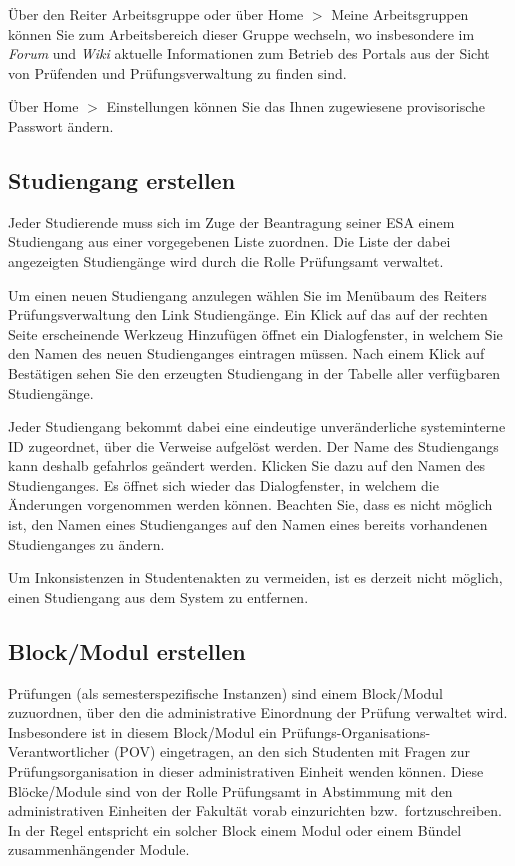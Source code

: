 \documentclass[a4paper,11pt]{article}
\newcommand{\knopf}[1]{{\sc #1}}
\begin{document}
Über den Reiter \knopf{Arbeitsgruppe} oder über \knopf{Home $>$ Meine
  Arbeitsgruppen} können Sie zum Arbeitsbereich dieser Gruppe wechseln, wo
insbesondere im {\em Forum} und {\em Wiki} aktuelle Informationen zum Betrieb
des Portals aus der Sicht von Prüfenden und Prüfungsverwaltung zu finden sind.

Über \knopf{Home $>$ Einstellungen} können Sie das Ihnen zugewiesene
provisorische Passwort ändern.

\subsection{Studiengang erstellen}

Jeder Studierende muss sich im Zuge der Beantragung seiner ESA einem Studiengang
aus einer vorgegebenen Liste zuordnen.  Die Liste der dabei angezeigten
Studiengänge wird durch die Rolle Prüfungsamt verwaltet. 

Um einen neuen Studiengang anzulegen wählen Sie im Menübaum des Reiters
\knopf{Prüfungsverwaltung} den Link \knopf{Studiengänge}. Ein Klick auf das
auf der rechten Seite erscheinende Werkzeug \knopf{Hinzufügen} öffnet ein
Dialogfenster, in welchem Sie den Namen des neuen Studienganges eintragen
müssen.  Nach einem Klick auf \knopf{Bestätigen} sehen Sie den erzeugten
Studiengang in der Tabelle aller verfügbaren Studiengänge.

Jeder Studiengang bekommt dabei eine eindeutige unveränderliche systeminterne
ID zugeordnet, über die Verweise aufgelöst werden. Der Name des Studiengangs
kann deshalb gefahrlos geändert werden. Klicken Sie dazu auf den Namen des
Studienganges. Es öffnet sich wieder das Dialogfenster, in welchem die
Änderungen vorgenommen werden können. Beachten Sie, dass es nicht möglich ist,
den Namen eines Studienganges auf den Namen eines bereits vorhandenen
Studienganges zu ändern.  

Um Inkonsistenzen in Studentenakten zu vermeiden, ist es derzeit nicht
möglich, einen Studiengang aus dem System zu entfernen.

\subsection{Block/Modul erstellen}

Prüfungen (als semesterspezifische Instanzen) sind einem Block/Modul
zuzuordnen, über den die administrative Einordnung der Prüfung verwaltet wird.
Insbesondere ist in diesem Block/Modul ein
Prüfungs-Organisations-Verantwortlicher (POV) eingetragen, an den sich
Studenten mit Fragen zur Prüfungsorganisation in dieser administrativen
Einheit wenden können.  Diese Blöcke/Module sind von der Rolle Prüfungsamt in
Abstimmung mit den administrativen Einheiten der Fakultät vorab einzurichten
bzw.\ fortzuschreiben.  In der Regel entspricht ein solcher Block einem Modul
oder einem Bündel zusammenhängender Module. 
\end{document}
